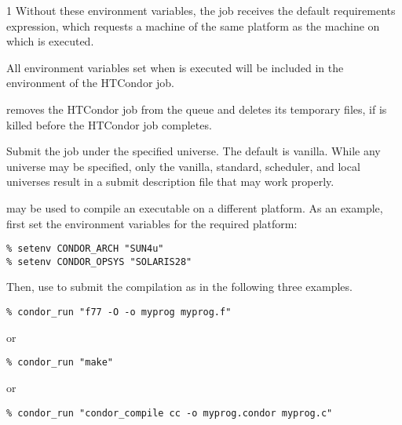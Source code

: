 \begin{ManPage}{\label{man-condor-run}}{1}
Without these environment variables, 
the job receives the default requirements expression, which
requests a machine of the same platform as
the machine on which  is executed.

All environment variables set when  is executed will be
included in the environment of the HTCondor job.

 removes the HTCondor job from the queue and
deletes its temporary files, if  is killed before the 
HTCondor job completes.

\begin{Options}

  {Submit the job under the specified universe. The default is vanilla.
  While any universe may be specified, only the vanilla, standard,
  scheduler, and local universes result in a submit description
  file that may work properly.}

\end{Options}

\Examples

 may be used to compile an executable on
a different platform.
As an example, first set the environment variables for
the required platform:

\begin{verbatim}
% setenv CONDOR_ARCH "SUN4u"
% setenv CONDOR_OPSYS "SOLARIS28"
\end{verbatim}

Then, use  to submit the compilation as in the
following three examples.
\begin{verbatim}
% condor_run "f77 -O -o myprog myprog.f"
\end{verbatim}
or
\begin{verbatim}
% condor_run "make"
\end{verbatim}
or
\begin{verbatim}
% condor_run "condor_compile cc -o myprog.condor myprog.c"
\end{verbatim}


\Files


\end{ManPage}
